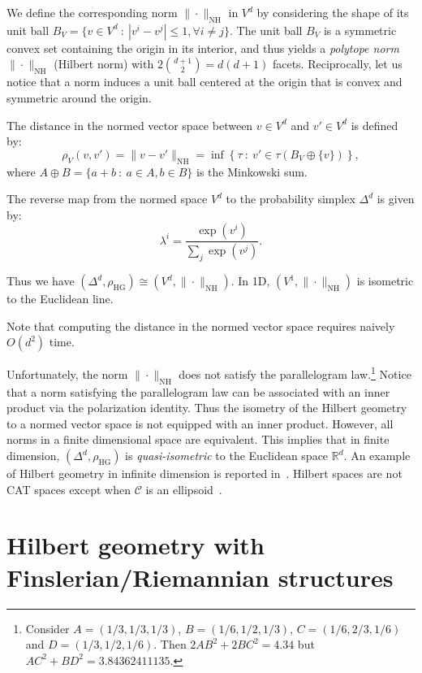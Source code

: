 \documentclass[graybox]{svmult}
\def\calC{\mathcal{C}}
\def\bbR{\mathbb{R}}
\def\st{\ :\ }
\def\HG{\mathrm{HG}}
\def\NH{\mathrm{NH}}  %
\begin{document}
We define the corresponding norm $\|\cdot\|_\NH$ in $V^d$ by considering the shape of its unit ball 
$B_V=\{v\in V^d \st |v^i-v^j|\leq 1, \forall i\not =j\}$.
The unit ball $B_V$ is a symmetric convex set containing the origin in its interior, and thus yields a {\em polytope norm}
 $\|\cdot\|_\NH$ (Hilbert norm) with $2\binom{d+1}{2}=d(d+1)$ facets.
Reciprocally, let us notice that a norm induces a unit ball centered at the origin that is convex and symmetric around the origin.

The distance in the normed vector space between $v\in V^d$ and $v'\in V^d$ is defined by:
\begin{equation*}
\rho_V(v,v')= \|v-v'\|_\NH = \inf \left\{ \tau \st v'\in \tau(B_V\oplus \{v\}) \right\},
\end{equation*}
where $A\oplus B=\{a+b \st a\in A,b\in B\}$ is the Minkowski sum.

The reverse map from the normed space $V^d$ to the probability simplex $\Delta^d$ is given by:
\begin{equation*}
\lambda^i = \frac{\exp({v^i})}{\sum_j \exp(v^j)}.
\end{equation*}


Thus we have $(\Delta^d,\rho_\HG)\cong (V^d,\|\cdot\|_\NH)$.
In 1D, $(V^1,\|\cdot\|_\NH)$ is isometric to the Euclidean line. 

Note that computing the distance in the normed vector space requires naively $O(d^2)$ time.

Unfortunately, the norm $\|\cdot\|_\NH$ does not satisfy the parallelogram law.\footnote{ Consider 
$A = (1/3,1/3,1/3)$, $B = (1/6,1/2,1/3)$, $C = (1/6,2/3,1/6)$ and
$D = (1/3,1/2,1/6)$. Then  $2AB^2 +2BC^2 = 4.34$ but $AC^2 + BD^2 = 3.84362411135$.
}
Notice that a norm satisfying the parallelogram law can be associated with an inner product via the polarization identity.
Thus the isometry of the Hilbert geometry to a normed vector space is not equipped with an inner product.
However, all norms in a finite dimensional space are equivalent.
This implies that in finite dimension, $(\Delta^d,\rho_\HG)$ is {\em quasi-isometric} to the Euclidean space $\bbR^d$.
An example of Hilbert geometry in infinite dimension is reported in~\cite{HilbertHarpe-1991}.
Hilbert spaces are not CAT spaces except when $\calC$ is an ellipsoid~\cite{Vernicos-2004}.

\section{Hilbert geometry with Finslerian/Riemannian structures\label{sec:HGFG}}
\end{document}
